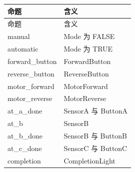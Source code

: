 \begin{longtable}{L{3.3cm}L{10.0cm}}

\toprule

命题 & 含义\\

\midrule

\endfirsthead

\toprule

命题 & 含义\\

\midrule

\endhead

{\ttfamily manual} & Mode 为 FALSE\\

{\ttfamily automatic} & Mode 为 TRUE\\

{\ttfamily forward\_button} & ForwardButton\\

{\ttfamily reverse\_button} & ReverseButton\\

{\ttfamily motor\_forward} & MotorForward\\

{\ttfamily motor\_reverse} & MotorReverse\\

{\ttfamily at\_a\_done} & SensorA 与 ButtonA\\

{\ttfamily at\_b} & SensorB\\

{\ttfamily at\_b\_done} & SensorB 与 ButtonB\\

{\ttfamily at\_c\_done} & SensorC 与 ButtonC\\

{\ttfamily completion} & CompletionLight\\

\bottomrule

\end{longtable}

